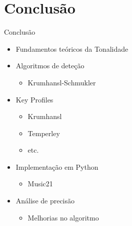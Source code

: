 \section{Conclusão}
\begin{frame}{Conclusão}{}
    \begin{itemize}
        \item Fundamentos teóricos da Tonalidade
        \item Algoritmos de deteção
        \begin{itemize}
            \item Krumhansl-Schmukler
        \end{itemize}
        \item Key Profiles
        \begin{itemize}
            \item Krumhansl
            \item Temperley
            \item etc.
        \end{itemize}
        \item Implementação em Python
        \begin{itemize}
            \item Music21
        \end{itemize}
        \item Análise de precisão
        \begin{itemize}
            \item Melhorias no algoritmo
        \end{itemize}
    \end{itemize}
\end{frame}
